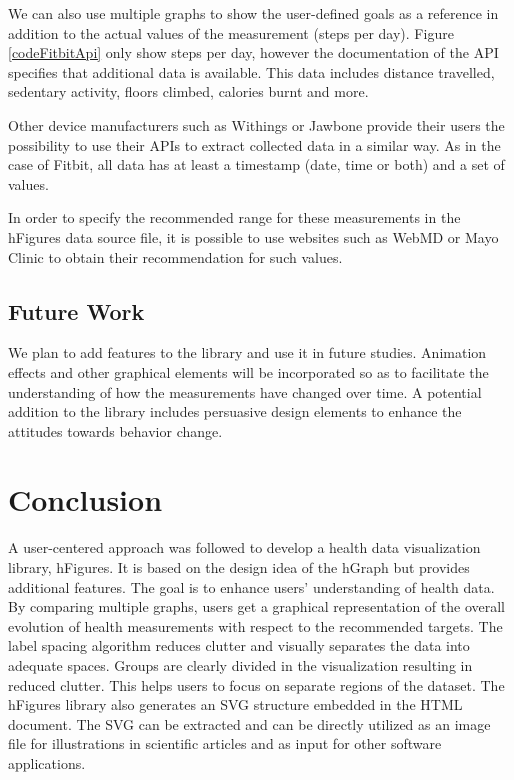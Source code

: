 \documentclass[twocolumn]{bmcart}%
\begin{document}
We can also use multiple graphs to show the user-defined goals as a reference in addition to the actual values of the measurement (steps per day). Figure \ref{codeFitbitApi} only show steps per day, however the documentation of the API specifies that additional data is available. This data includes distance travelled, sedentary activity, floors climbed, calories burnt and more.

Other device manufacturers such as Withings or Jawbone provide their users the possibility to use their APIs to extract collected data in a similar way. As in the case of Fitbit, all data has at least a timestamp (date, time or both) and a set of values.

In order to specify the recommended range for these measurements in the hFigures data source file, it is possible to use websites such as WebMD or Mayo Clinic to obtain their recommendation for such values.

\subsection*{Future Work}

We plan to add features to the library and use it in future studies. Animation effects and other graphical elements will be incorporated so as to facilitate the understanding of how the measurements have changed over time. A potential addition to the library includes persuasive design elements to enhance the attitudes towards behavior change.

\section*{Conclusion}

A user-centered approach was followed to develop a health data visualization library, hFigures. It is based on the design idea of the hGraph but provides additional features. The goal is to enhance users' understanding of health data.
By comparing multiple graphs, users get a graphical representation of the overall evolution of health measurements with respect to the recommended targets. The label spacing algorithm reduces clutter and visually separates the data into adequate spaces. Groups are clearly divided in the visualization resulting in reduced clutter. This helps users to focus on separate regions of the dataset. The hFigures library also generates an SVG structure embedded in the HTML document. The SVG can be extracted and can be directly utilized as an image file for illustrations in scientific articles and as input for other software applications.
\end{document}
